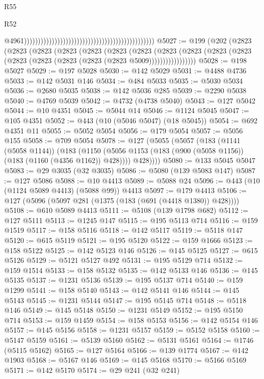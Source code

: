 \begin{lexlean}{R55}
\begin{lexlean}{R52}
\begin{coremodule}
{{{{{{{{{{{{{{{{{{{{{{{{{{{{{{{{{{{{{{{{{{{{{{{{{{{{{{{{{{{{{{{{{{{{{{{{{{{{{{{{{{{{{{{{{{{{{{{{{{{{{{{{{{{{{{{{{{{{{{{{{{{{{{{{{{{{{{{{{{{{{{{{{{{{{{{{{{{{{{{{{{{{{{{{{{{{{{{{{{{{{{{{{{{{{{{{{{{{{{                                                                                                  @4961)))))))))))))))))))))))))))))))))))))))))))))))
@5027 := @199
    (@202
      (@2823
        (@2823
          (@2823
            (@2823
              (@2823
                (@2823
                  (@2823
                    (@2823
                      (@2823 (@2823 (@2823 (@2823 (@2823 (@2823 (@2823 (@2823 @5009)))))))))))))))))
@5028 := @198 @5027
@5029 := @197 @5028
@5030 := @142 @5029
@5031 := @4488 @4736
@5033 := @142 @5031 @146
@5034 := @484 @5033
@5035 := @5030 @5034
@5036 := @2680 @5035
@5038 := @142 @5036 @285
@5039 := @2290 @5038
@5040 := @4769 @5039
@5042 := @4732 (@4738 @5040)
@5043 := @127 @5042
@5044 := @10 @4351
@5045 := @5044 @14
@5046 := @1124 @5045
@5047 := @105 @4351
@5052 := @443 (@10 (@5046 @5047) (@18 @5045))
@5054 := @692 @4351 @11
@5055 := @5052 @5054
@5056 := @179 @5054
@5057 := @5056 @155
@5058 := @709 @5054
@5078 := @127
    (@5055
      (@5057
        (@183
          (@1141 (@5058 @1144))
          (@183
            (@1150 (@5056 @1153 (@183 (@900 (@5058 @1156)) (@183 (@1160 (@4356 @1162)) @428))))
            @428))))
@5080 := @133 @5045 @5047
@5083 := @29 @3035 (@32 @3035)
@5086 := @5080 (@139 @5083 @147)
@5087 := @127 @5086
@5088 := @10 @4413
@5089 := @5088 @24
@5096 := @443 (@10 (@1124 @5089 @4413) (@5088 @99)) @4413
@5097 := @179 @4413
@5106 := @127 (@5096 (@5097 @281 (@1375 (@183 (@691 (@4418 @1380)) @428))))
@5108 := @610 @5089 @4413
@5111 := @5108 (@139 @1798 @682)
@5112 := @127 @5111
@5113 := @1245 @147
@5115 := @195 @5113 @714
@5116 := @159 @1519
@5117 := @158 @5116
@5118 := @142 @5117
@5119 := @5118 @147
@5120 := @615 @5119
@5121 := @195 @5120
@5122 := @159 @1666
@5123 := @158 @5122
@5125 := @142 @5123 @146
@5126 := @145 @5125
@5127 := @615 @5126
@5129 := @5121 @5127 @492
@5131 := @195 @5129 @714
@5132 := @159 @1514
@5133 := @158 @5132
@5135 := @142 @5133 @146
@5136 := @145 @5135
@5137 := @1231 @5136
@5139 := @195 @5137 @714
@5140 := @159 @1299
@5141 := @158 @5140
@5143 := @142 @5141 @146
@5144 := @145 @5143
@5145 := @1231 @5144
@5147 := @195 @5145 @714
@5148 := @5118 @146
@5149 := @145 @5148
@5150 := @1231 @5149
@5152 := @195 @5150 @714
@5153 := @159 @1459
@5154 := @158 @5153
@5156 := @142 @5154 @146
@5157 := @145 @5156
@5158 := @1231 @5157
@5159 := @5152 @5158
@5160 := @5147 @5159
@5161 := @5139 @5160
@5162 := @5131 @5161
@5164 := @1746 (@5115 @5162)
@5165 := @127 @5164
@5166 := @139 @1774
@5167 := @142 @1903
@5168 := @5167 @146
@5169 := @145 @5168
@5170 := @5166 @5169
@5171 := @142 @5170
@5174 := @29 @241 (@32 @241)
}}}}}}}}}}}}}}}}}}}}}}}}}}}}}}}}}}}}}}}}}}}}}}}}}}}}}}}}}}}}}}}}}}}}}}}}}}}}}}}}}}}}}}}}}}}}}}}}}}}}}}}}}}}}}}}}}}}}}}}}}}}}}}}}}}}}}}}}}}}}}}}}}}}}}}}}}}}}}}}}}}}}}}}}}}}}}}}}}}}}}}}}}}}}}}}}}}}}}}
\end{coremodule}
\end{lexlean}
\end{lexlean}
